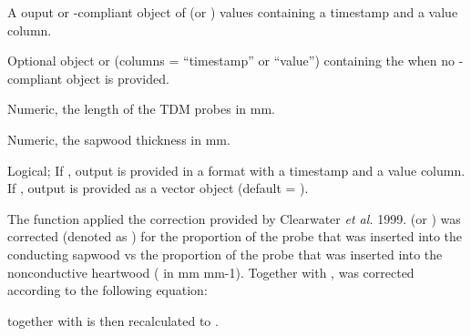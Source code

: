 \documentclass[a4paper]{book}
\begin{document}
\begin{Arguments}
\begin{ldescription}
\item[\code{input}] A  ouput or -compliant object of  (or ) values containing
a timestamp and a value column.

\item[\code{dt.max}] Optional  object or  (columns = “timestamp” or “value”)
containing the  when no -compliant object is provided.

\item[\code{probe.length}] Numeric, the length of the TDM probes in mm.

\item[\code{sapwood.thickness}] Numeric, the sapwood thickness in mm.

\item[\code{df}] Logical; If , output is provided in a  format
with a timestamp and a value column. If , output
is provided as a  vector object (default = ).
\end{ldescription}
\end{Arguments}
%
\begin{Details}\relax
The function applied the correction provided by Clearwater \emph{et al.} 1999.
 (or ) was corrected (denoted as ) for the proportion of
the probe that was inserted into the conducting sapwood vs the
proportion of the probe that was inserted into the nonconductive heartwood
(\eqn{\gamma}{} in mm mm-1). Together with ,  was corrected
according to the following equation:

 together with  is then recalculated to .
\end{Details}
%
\end{document}
